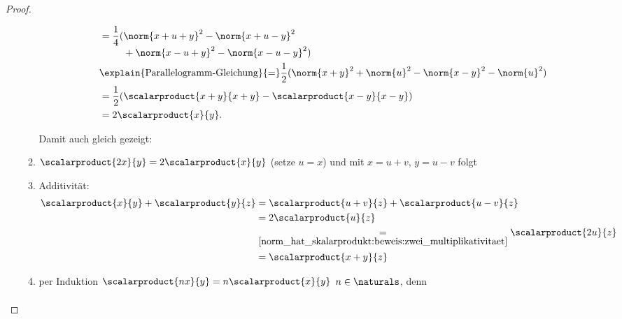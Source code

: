 \begin{proof}
\begin{proofdescription}
\begin{subproof}
\begin{proofdescription}
\begin{itemize}
\begin{enumerate}[label=\rechtsklammer{\arabic*}]
\begin{subproof}[denn:]
\begin{align*}
\begin{aligned}[t]
                                    &=\frac{1}{4}(\begin{aligned}[t]
                                        &\norm{x+u+y}^2-\norm{x+u-y}^2\\
                                        &+\norm{x-u+y}^2-\norm{x-u-y}^2)
                                    \end{aligned}
                                    \\
                                    &\explain{\text{Parallelogramm-Gleichung}}{=}\frac{1}{2}(\norm{x+y}^2+\norm{u}^2-\norm{x-y}^2-\norm{u}^2)\\
                                    &=\frac{1}{2}(\scalarproduct{x+y}{x+y}-\scalarproduct{x-y}{x-y})\\
                                    &=2\scalarproduct{x}{y}.
                                \end{aligned}
                            \end{align*}
                        \end{subproof}
                        Damit auch gleich gezeigt:
                        \item \label{norm_hat_skalarprodukt:beweis:zwei_multiplikativitaet}\( \scalarproduct{2x}{y}=2\scalarproduct{x}{y} \) (setze \( u=x \)) und mit \( x=u+v \), \( y=u-v \) folgt
                        \item \label{norm_hat_skalarprodukt:beweis:additivitaet}Additivität:
                        \begin{align*}
                            \scalarproduct{x}{y}+\scalarproduct{y}{z}\begin{aligned}[t]
                                &=\scalarproduct{u+v}{z}+\scalarproduct{u-v}{z}\\
                                &=2\scalarproduct{u}{z}\\
                                &\underset{\ref{norm_hat_skalarprodukt:beweis:zwei_multiplikativitaet}}{=}\scalarproduct{2u}{z}\\
                                &=\scalarproduct{x+y}{z}
                            \end{aligned}
                        \end{align*}
                        \item \label{norm_hat_skalarprodukt:beweis:natuerliche_multiplikativitaet}per Induktion \( \scalarproduct{nx}{y}=n\scalarproduct{x}{y} \) \tforall \( n\in \naturals \), denn
                        \begin{align*}

\end{align*}
\end{enumerate}
\end{itemize}
\end{proofdescription}
\end{subproof}
\end{proofdescription}
\end{proof}
